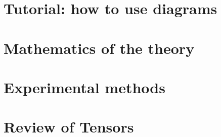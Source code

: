     \newpage
    \section{Tutorial: how to use diagrams}\label{appendix:tutorial}
        
    
    \newpage
    \section{Mathematics of the theory}\label{appendix:math}
        
    
    \newpage
    \section{Experimental methods}\label{appendix:experiments}
        
    
    \newpage
    \section{Review of Tensors}
        


